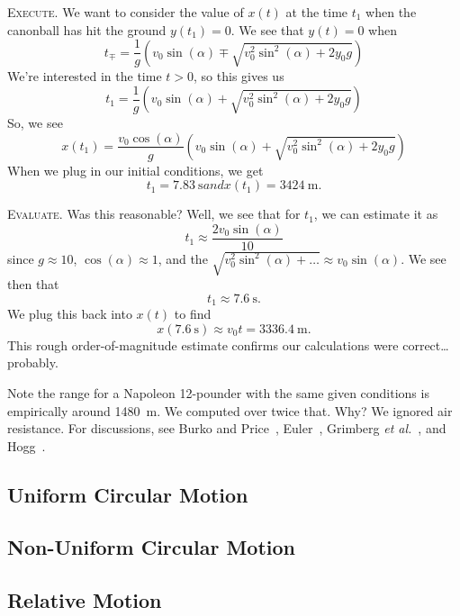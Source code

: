 \textsc{Execute.}
We want to consider the value of $x(t)$ at the time $t_{1}$ when the
canonball has hit the ground $y(t_{1})=0$. We see that $y(t)=0$ when
\begin{equation}
t_{\mp} = \frac{1}{g}\left(v_{0}\sin(\alpha)
         \mp\sqrt{v_{0}^{2}\sin^{2}(\alpha) + 2y_{0}g}\right)
\end{equation}
We're interested in the time $t>0$, so this gives us
\begin{equation}
t_{1} = \frac{1}{g}\left(v_{0}\sin(\alpha)
         + \sqrt{v_{0}^{2}\sin^{2}(\alpha) + 2y_{0}g}\right)
\end{equation}
So, we see
\begin{equation}
x(t_{1}) = \frac{v_{0}\cos(\alpha)}{g}\left(v_{0}\sin(\alpha)
         + \sqrt{v_{0}^{2}\sin^{2}(\alpha) + 2y_{0}g}\right)
\end{equation}
When we plug in our initial conditions, we get
\begin{subequations}
\begin{equation}
t_{1}=\SI{7.83}{\second}
\end{equation}
and
\begin{equation}
x(t_{1})=\SI{3424}{\meter}.
\end{equation}
\end{subequations}

\textsc{Evaluate.} Was this reasonable? Well, we see that for $t_{1}$,
we can estimate it as
\begin{equation}
t_{1}\approx \frac{2v_{0}\sin(\alpha)}{10}
\end{equation}
since $g\approx 10$, $\cos(\alpha)\approx 1$, and the
$\sqrt{v_{0}^{2}\sin^{2}(\alpha)+\dots}\approx 
v_{0}\sin(\alpha)$. We see then that
\begin{equation}
t_{1}\approx \SI{7.6}{\second}.
\end{equation}
We plug this back into $x(t)$ to find
\begin{equation}
x(\SI{7.6}{\second})\approx v_{0}t = \SI{3336.4}{\meter}.
\end{equation}
This rough order-of-magnitude estimate confirms our calculations were
correct\dots probably.

\begin{rmk}
Note the range for a Napoleon 12-pounder with the same given conditions
is empirically around \SI{1480}{\meter}. We computed over twice
that. Why? We ignored air resistance. For discussions, see
Burko and Price~\cite{burko2003}, Euler~\cite{e77,e217,e226}, 
Grimberg \emph{et al.}~\cite{grimberg2008}, and Hogg~\cite{hogg2007}. 
\end{rmk}

\subsection{Uniform Circular Motion}

\subsection{Non-Uniform Circular Motion}

\subsection{Relative Motion}
